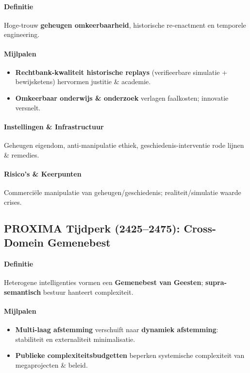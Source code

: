 \documentclass[11pt]{article}
\begin{document}
\paragraph{Definitie} Hoge-trouw \textbf{geheugen omkeerbaarheid}, historische re-enactment en temporele engineering.

\paragraph{Mijlpalen}
\begin{itemize}[noitemsep]
  \item \textbf{Rechtbank-kwaliteit historische replays} (verifieerbare simulatie + bewijsketens) hervormen justitie \& academie.
  \item \textbf{Omkeerbaar onderwijs \& onderzoek} verlagen faalkosten; innovatie versnelt.
\end{itemize}

\paragraph{Instellingen \& Infrastructuur} Geheugen eigendom, anti-manipulatie ethiek, geschiedenis-interventie rode lijnen \& remedies.

\paragraph{Risico's \& Keerpunten} Commerciële manipulatie van geheugen/geschiedenis; realiteit/simulatie waarde crises.

\subsection{PROXIMA Tijdperk (2425–2475): Cross-Domein Gemenebest}
\paragraph{Definitie} Heterogene intelligenties vormen een \textbf{Gemenebest van Geesten}; \textbf{supra-semantisch} bestuur hanteert complexiteit.

\paragraph{Mijlpalen}
\begin{itemize}[noitemsep]
  \item \textbf{Multi-laag afstemming} verschuift naar \textbf{dynamiek afstemming}: stabiliteit en externaliteit minimalisatie.
  \item \textbf{Publieke complexiteitsbudgetten} beperken systemische complexiteit van megaprojecten \& beleid.
\end{itemize}
\end{document}

